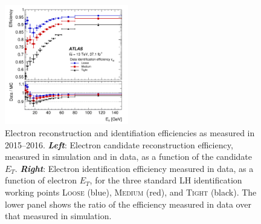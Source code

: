 \begin{figure}[!htb]
    \begin{center}
        \includegraphics[width=0.48\textwidth]{figures/chapter3/egamma/egamma_id_eff_Et}
        \caption{
            Electron reconstruction and identifiation efficiencies as measured in 2015--2016.
            \textbf{\textit{Left}}: Electron candidate reconstruction efficiency, measured in simulation and in data, as
                a function of the candidate $E_T$.
            \textbf{\textit{Right}}: Electron identification efficiency measured in data, as a function of electron $E_T$,
                for the three standard LH identification working points \textsc{Loose} (blue), \textsc{Medium} (red), and \textsc{Tight} (black).
                The lower panel shows the ratio of the efficiency measured in data over that measured in simulation.
        }
        \label{fig:egamma_eff_Et}
    \end{center}
\end{figure}

%
%

